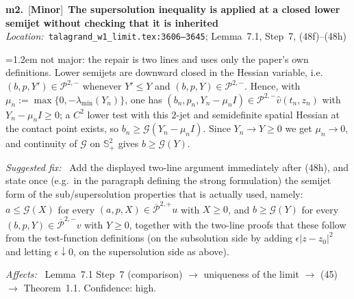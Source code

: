 \documentclass[11pt]{article}
\newcommand{\sevMin}{\textcolor{Goldenrod!60!black}{\textbf{Minor}}}
\newenvironment{finding}[4]{%
  \par\medskip\noindent
  \textbf{#1.}~[#2]~\textbf{#4}\\
  \noindent\textit{Location:}~#3\par\nopagebreak\begin{list}{}{\leftmargin=1.2em\itemsep=2pt\parsep=0pt}}%
  {\end{list}\medskip}
\newcommand{\field}[1]{\item[]\textit{#1:}~}
\newcommand{\Sp}{\mathbb{S}^2_+}
\begin{document}
\begin{finding}{m2}{\sevMin}{\texttt{talagrand\_w1\_limit.tex:3606--3645}; Lemma~7.1, Step~7, (48f)--(48h)}{The supersolution inequality is applied at a closed lower semijet without checking that it is inherited}
  not major: the repair is two lines and uses only the paper's own definitions. Lower semijets
  are downward closed in the Hessian variable, i.e.\ $(b,p,Y')\in\mathcal P^{2,-}$ whenever
  $Y'\le Y$ and $(b,p,Y)\in\mathcal P^{2,-}$. Hence, with
  $\mu_n:=\max\{0,-\lambda_{\min}(Y_n)\}$, one has $(b_n,p_n,Y_n-\mu_nI)\in\mathcal P^{2,-}
  \widehat v(t_n,z_n)$ with $Y_n-\mu_nI\ge0$; a $C^2$ lower test with this $2$-jet and
  semidefinite spatial Hessian at the contact point exists, so
  $b_n\ge\mathcal G(Y_n-\mu_nI)$. Since $Y_n\to Y\ge0$ we get $\mu_n\to0$, and continuity of
  $\mathcal G$ on $\Sp$ gives $b\ge\mathcal G(Y)$.
  \field{Suggested fix} Add the displayed two-line argument immediately after (48h), and state
  once (e.g.\ in the paragraph defining the strong formulation) the semijet form of the
  sub/supersolution properties that is actually used, namely: $a\le\mathcal G(X)$ for every
  $(a,p,X)\in\overline{\mathcal P}^{2,+}u$ with $X\ge0$, and $b\ge\mathcal G(Y)$ for every
  $(b,p,Y)\in\overline{\mathcal P}^{2,-}v$ with $Y\ge0$, together with the two-line proofs that
  these follow from the test-function definitions (on the subsolution side by adding
  $\epsilon|z-z_0|^2$ and letting $\epsilon\downarrow0$, on the supersolution side as above).
  \field{Affects} Lemma~7.1 Step~7 (comparison) $\to$ uniqueness of the limit $\to$ (45) $\to$
  Theorem~1.1. Confidence: high.
\end{finding}
\end{document}

